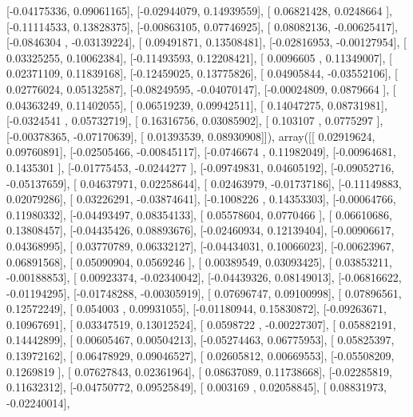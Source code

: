 \documentclass{article}
\begin{document}
       [-0.04175336,  0.09061165],
       [-0.02944079,  0.14939559],
       [ 0.06821428,  0.0248664 ],
       [-0.11114533,  0.13828375],
       [-0.00863105,  0.07746925],
       [ 0.08082136, -0.00625417],
       [-0.0846304 , -0.03139224],
       [ 0.09491871,  0.13508481],
       [-0.02816953, -0.00127954],
       [ 0.03325255,  0.10062384],
       [-0.11493593,  0.12208421],
       [ 0.0096605 ,  0.11349007],
       [ 0.02371109,  0.11839168],
       [-0.12459025,  0.13775826],
       [ 0.04905844, -0.03552106],
       [ 0.02776024,  0.05132587],
       [-0.08249595, -0.04070147],
       [-0.00024809,  0.0879664 ],
       [ 0.04363249,  0.11402055],
       [ 0.06519239,  0.09942511],
       [ 0.14047275,  0.08731981],
       [-0.0324541 ,  0.05732719],
       [ 0.16316756,  0.03085902],
       [ 0.103107  ,  0.0775297 ],
       [-0.00378365, -0.07170639],
       [ 0.01393539,  0.08930908]]), array([[ 0.02919624,  0.09760891],
       [-0.02505466, -0.00845117],
       [-0.0746674 ,  0.11982049],
       [-0.00964681,  0.1435301 ],
       [-0.01775453, -0.0244277 ],
       [-0.09749831,  0.04605192],
       [-0.09052716, -0.05137659],
       [ 0.04637971,  0.02258644],
       [ 0.02463979, -0.01737186],
       [-0.11149883,  0.02079286],
       [ 0.03226291, -0.03874641],
       [-0.1008226 ,  0.14353303],
       [-0.00064766,  0.11980332],
       [-0.04493497,  0.08354133],
       [ 0.05578604,  0.0770466 ],
       [ 0.06610686,  0.13808457],
       [-0.04435426,  0.08893676],
       [-0.02460934,  0.12139404],
       [-0.00906617,  0.04368995],
       [ 0.03770789,  0.06332127],
       [-0.04434031,  0.10066023],
       [-0.00623967,  0.06891568],
       [ 0.05090904,  0.0569246 ],
       [ 0.00389549,  0.03093425],
       [ 0.03853211, -0.00188853],
       [ 0.00923374, -0.02340042],
       [-0.04439326,  0.08149013],
       [-0.06816622, -0.01194295],
       [-0.01748288, -0.00305919],
       [ 0.07696747,  0.09100998],
       [ 0.07896561,  0.12572249],
       [ 0.054003  ,  0.09931055],
       [-0.01180944,  0.15830872],
       [-0.09263671,  0.10967691],
       [ 0.03347519,  0.13012524],
       [ 0.0598722 , -0.00227307],
       [ 0.05882191,  0.14442899],
       [ 0.00605467,  0.00504213],
       [-0.05274463,  0.06775953],
       [ 0.05825397,  0.13972162],
       [ 0.06478929,  0.09046527],
       [ 0.02605812,  0.00669553],
       [-0.05508209,  0.1269819 ],
       [ 0.07627843,  0.02361964],
       [ 0.08637089,  0.11738668],
       [-0.02285819,  0.11632312],
       [-0.04750772,  0.09525849],
       [ 0.003169  ,  0.02058845],
       [ 0.08831973, -0.02240014],
\end{document}
